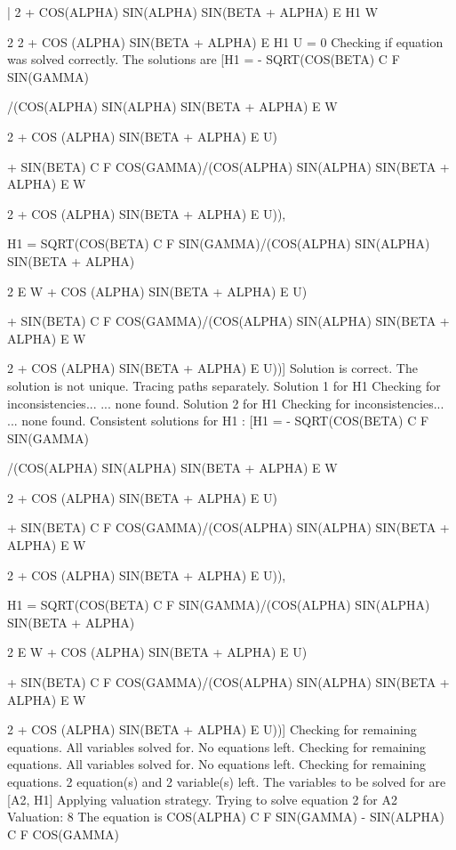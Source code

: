 \begin{literatim}{|}
                                               2
 + COS(ALPHA) SIN(ALPHA) SIN(BETA + ALPHA) E H1  W

      2                                     2
 + COS (ALPHA) SIN(BETA + ALPHA) E H1  U = 0
Checking if equation was solved correctly.
The solutions are [H1 = - SQRT(COS(BETA) C F SIN(GAMMA)

/(COS(ALPHA) SIN(ALPHA) SIN(BETA + ALPHA) E W

      2
 + COS (ALPHA) SIN(BETA + ALPHA) E U)

 + SIN(BETA) C F COS(GAMMA)/(COS(ALPHA) SIN(ALPHA) SIN(BETA + ALPHA) E W

      2
 + COS (ALPHA) SIN(BETA + ALPHA) E U)), 

H1 = SQRT(COS(BETA) C F SIN(GAMMA)/(COS(ALPHA) SIN(ALPHA) SIN(BETA + ALPHA)

          2
 E W + COS (ALPHA) SIN(BETA + ALPHA) E U)

 + SIN(BETA) C F COS(GAMMA)/(COS(ALPHA) SIN(ALPHA) SIN(BETA + ALPHA) E W

      2
 + COS (ALPHA) SIN(BETA + ALPHA) E U))]
Solution is correct.
The solution is not unique. Tracing paths separately.
Solution 1 for H1
Checking for inconsistencies...
... none found.
Solution 2 for H1
Checking for inconsistencies...
... none found.
Consistent solutions for H1 : [H1 = - SQRT(COS(BETA) C F SIN(GAMMA)

/(COS(ALPHA) SIN(ALPHA) SIN(BETA + ALPHA) E W

      2
 + COS (ALPHA) SIN(BETA + ALPHA) E U)

 + SIN(BETA) C F COS(GAMMA)/(COS(ALPHA) SIN(ALPHA) SIN(BETA + ALPHA) E W

      2
 + COS (ALPHA) SIN(BETA + ALPHA) E U)), 

H1 = SQRT(COS(BETA) C F SIN(GAMMA)/(COS(ALPHA) SIN(ALPHA) SIN(BETA + ALPHA)

          2
 E W + COS (ALPHA) SIN(BETA + ALPHA) E U)

 + SIN(BETA) C F COS(GAMMA)/(COS(ALPHA) SIN(ALPHA) SIN(BETA + ALPHA) E W

      2
 + COS (ALPHA) SIN(BETA + ALPHA) E U))]
Checking for remaining equations.
All variables solved for. No equations left.
Checking for remaining equations.
All variables solved for. No equations left.
Checking for remaining equations.
2 equation(s) and 2 variable(s) left.
The variables to be solved for are [A2, H1]
Applying valuation strategy.
Trying to solve equation 2 for A2
Valuation: 8
The equation is COS(ALPHA) C F SIN(GAMMA) - SIN(ALPHA) C F COS(GAMMA)


\end{literatim}
